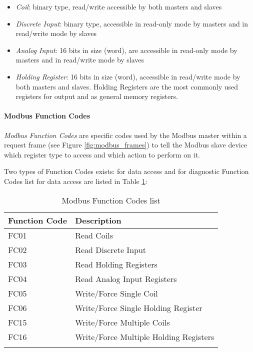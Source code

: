 \begin{itemize}
	\item \textit{Coil}: binary type, read/write accessible by both masters and slaves

	\item \textit{Discrete Input}: binary type, accessible in read-only mode by masters and in read/write mode by slaves

	\item \textit{Analog Input}: 16 bits in size (word), are accessible in read-only mode by masters and in read/write mode by slaves

	\item \textit{Holding Register}:  16 bits in size (word), accessible in read/write mode by both masters and slaves. Holding Registers are the most commonly used registers for output and as general memory registers.
\end{itemize}

\paragraph{Modbus Function Codes}
\label{par:2_modbus_func_codes}
\textit{Modbus Function Codes} are specific codes used by the Modbus master within a request frame (see Figure \ref{fig:modbus_frames}) to tell the Modbus slave device which register type to access and which action to perform on it.

\bigskip
Two types of Function Codes exists: for data access and for diagnostic
Function Codes list for data access are listed in Table \ref{table:modbus_fc_list}:

\bigskip
\begin{longtable}[c]{p{} p{} }
	\hline
	\textbf{Function Code} & \textbf{Description} \\ [0.5ex] 
	\hline
	FC01 & Read Coils \\
	\hline 
	FC02 & Read Discrete Input \\
	\hline
	FC03 & Read Holding Registers \\
	\hline
	FC04 & Read Analog Input Registers \\
	\hline
	FC05 & Write/Force Single Coil \\ 
	\hline
	FC06 & Write/Force Single Holding Register \\ 
	\hline 
	FC15 & Write/Force Multiple Coils \\ 
	\hline
	FC16 & Write/Force Multiple Holding Registers \\ 
	\hline
	
	\caption{Modbus Function Codes list}
	\label{table:modbus_fc_list}
\end{longtable}

